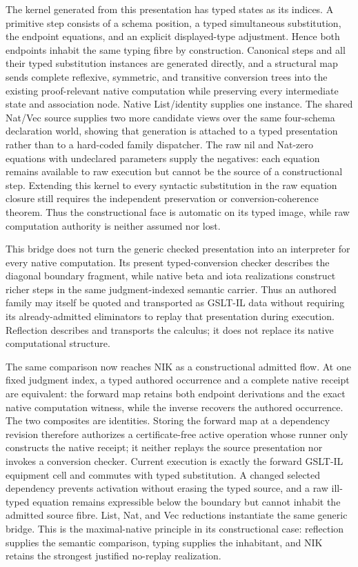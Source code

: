 \documentclass[11pt]{article}
\begin{document}
The kernel generated from this presentation has typed states as its indices.
A primitive step consists of a schema position, a typed simultaneous
substitution, the endpoint equations, and an explicit displayed-type
adjustment.  Hence both endpoints inhabit the same typing fibre by construction.
Canonical steps and all their typed substitution instances are generated
directly, and a structural map sends complete reflexive, symmetric, and
transitive conversion trees into the existing proof-relevant native computation
while preserving every intermediate state and association node.  Native
List/identity supplies one instance.  The shared Nat/Vec source supplies two
more candidate views over the same four-schema declaration world, showing that
generation is attached to a typed presentation rather than to a hard-coded
family dispatcher.  The raw nil and Nat-zero equations with undeclared
parameters supply the negatives: each equation remains available to raw
execution but cannot be the source of a constructional step.  Extending this
kernel to every syntactic substitution in the raw equation closure still
requires the independent preservation or conversion-coherence theorem.  Thus
the constructional face is automatic on its typed image, while raw computation
authority is neither assumed nor lost.

This bridge does not turn the generic checked presentation into an interpreter
for every native computation.  Its present typed-conversion checker describes
the diagonal boundary fragment, while native beta and iota realizations
construct richer steps in the same judgment-indexed semantic carrier.  Thus an
authored family may itself be quoted and transported as GSLT-IL data without
requiring its already-admitted eliminators to replay that presentation during
execution.  Reflection describes and transports the calculus; it does not
replace its native computational structure.

The same comparison now reaches NIK as a constructional admitted flow.  At one
fixed judgment index, a typed authored occurrence and a complete native receipt
are equivalent: the forward map retains both endpoint derivations and the exact
native computation witness, while the inverse recovers the authored occurrence.
The two composites are identities.  Storing the forward map at a dependency
revision therefore authorizes a certificate-free active operation whose runner
only constructs the native receipt; it neither replays the source presentation
nor invokes a conversion checker.  Current execution is exactly the forward
GSLT-IL equipment cell and commutes with typed substitution.  A changed selected
dependency prevents activation without erasing the typed source, and a raw
ill-typed equation remains expressible below the boundary but cannot inhabit
the admitted source fibre.  List, Nat, and Vec reductions instantiate the same
generic bridge.  This is the maximal-native principle in its constructional
case: reflection supplies the semantic comparison, typing supplies the
inhabitant, and NIK retains the strongest justified no-replay realization.
\end{document}
